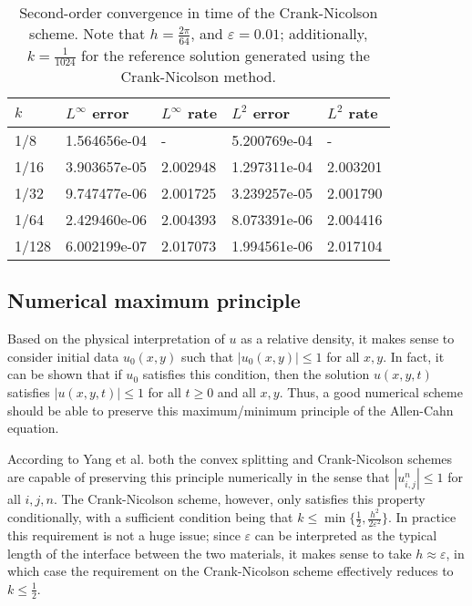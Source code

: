 \documentclass{article}
\begin{document}
	\begin{table}[h]
		\centering
		\begin{tabular}{@{}lllll@{}}
			\toprule
			$k$ & $L^\infty$ error & $L^\infty$ rate & $L^2$ error & $L^2$ rate \\
			\midrule
			1/8&	1.564656e-04&	-       &	5.200769e-04&	-       \\
			1/16&	3.903657e-05&	2.002948&	1.297311e-04&	2.003201\\
			1/32&	9.747477e-06&	2.001725&	3.239257e-05&	2.001790\\
			1/64&	2.429460e-06&	2.004393&	8.073391e-06&	2.004416\\
			1/128&	6.002199e-07&	2.017073&	1.994561e-06&	2.017104\\
			\bottomrule
		\end{tabular}
		\caption{Second-order convergence in time of the Crank-Nicolson scheme. Note that $h = \frac{2\pi}{64}$, and $\varepsilon = 0.01$; additionally, $k = \frac{1}{1024}$ for the reference solution generated using the Crank-Nicolson method.}
		\label{table:second_order}
	\end{table}
	
	\subsection{Numerical maximum principle}
	
	Based on the physical interpretation of $u$ as a relative density, it makes sense to consider initial data $u_0(x,y)$ such that $|u_0(x,y)| \le 1$ for all $x,y$. In fact, it can be shown that if $u_0$ satisfies this condition, then the solution $u(x,y,t)$ satisfies $|u(x,y,t)| \le 1$ for all $t \ge0$ and all $x,y$. Thus, a good numerical scheme should be able to preserve this maximum/minimum principle of the Allen-Cahn equation.
	
	According to Yang et al. \cite{yang_2018} both the convex splitting and Crank-Nicolson schemes are capable of preserving this principle numerically in the sense that $|u^n_{i,j}| \le 1$ for all $i,j,n$. The Crank-Nicolson scheme, however, only satisfies this property conditionally, with a sufficient condition being that $k \le \min\{\frac{1}{2}, \frac{h^2}{2\varepsilon^2}\}$. In practice this requirement is not a huge issue; since $\varepsilon$ can be interpreted as the typical length of the interface between the two materials, it makes sense to take $h \approx \varepsilon$, in which case the requirement on the Crank-Nicolson scheme effectively reduces to $k \le \frac{1}{2}$.
	
\end{document}
